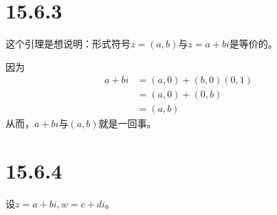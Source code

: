 \documentclass{article}
\begin{document}
\section*{15.6.3}

这个引理是想说明：形式符号$z = (a, b)$与$z = a + bi$是等价的。

因为
\begin{align*}
  a + bi & = (a, 0) + (b, 0)(0, 1) \\
         & = (a, 0) + (0, b)       \\
         & = (a, b)
\end{align*}
从而，$a + bi$与$(a, b)$就是一回事。

\section*{15.6.4}

设$z = a + bi, w = c + di$。
\end{document}
